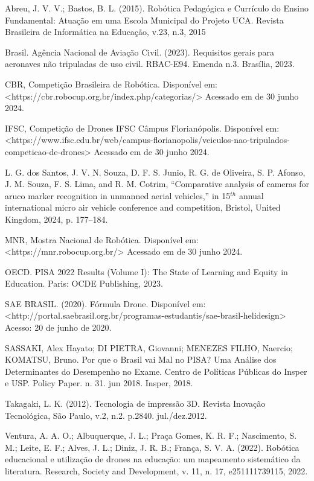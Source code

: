 \documentclass[conference]{IEEEtran}
\begin{document}
\begin{thebibliography}{00}
 Abreu, J. V. V.; Bastos, B. L. (2015). Robótica Pedagógica e Currículo do Ensino Fundamental: Atuação em uma Escola Municipal do Projeto UCA. Revista Brasileira de Informática na Educação, v.23, n.3, 2015

 Brasil. Agência Nacional de Aviação Civil. (2023). Requisitos gerais para aeronaves não tripuladas de uso civil. RBAC-E94. Emenda n.3. Brasília, 2023.

 CBR, Competição Brasileira de Robótica. Disponível em: <https://cbr.robocup.org.br/index.php/categorias/> Acessado em de 30 junho 2024.

 IFSC, Competição de Drones IFSC Câmpus Florianópolis. Disponível em: <https://www.ifsc.edu.br/web/campus-florianopolis/veiculos-nao-tripulados-competicao-de-drones> Acessado em de 30 junho 2024.

 L. G. dos Santos, J. V. N. Souza, D. F. S. Junio, R. G. de Oliveira, S. P. Afonso, J. M. Souza, F. S. Lima, and R. M. Cotrim, “Comparative analysis of cameras for aruco marker recognition in unmanned aerial vehicles,” in 15$^{th}$ annual international micro air vehicle conference and competition, Bristol, United Kingdom, 2024, p. 177–184.

 MNR, Mostra Nacional de Robótica. Disponível em: <https://mnr.robocup.org.br/> Acessado em de 30 junho 2024.

 OECD. PISA 2022 Results (Volume I): The State of Learning and Equity in Education. Paris: OCDE Publishing, 2023.

 SAE BRASIL. (2020). Fórmula Drone. Disponível em: <http://portal.saebrasil.org.br/programas-estudantis/sae-brasil-helidesign> Acesso: 20 de junho de 2020.

 SASSAKI, Alex Hayato; DI PIETRA, Giovanni; MENEZES FILHO, Naercio; KOMATSU, Bruno. Por que o Brasil vai Mal no PISA? Uma Análise dos Determinantes do Desempenho no Exame. Centro de Políticas Públicas do Insper e USP. Policy Paper. n. 31. jun 2018. Insper, 2018. 

 Takagaki, L. K. (2012). Tecnologia de impressão 3D. Revista Inovação Tecnológica, São Paulo, v.2, n.2. p.2840. jul./dez.2012. 

 Ventura, A. A. O.; Albuquerque, J. L.; Praça Gomes, K. R. F.; Nascimento, S. M.; Leite, E. F.; Alves, J. L.; Diniz, J. R. B.; França, S. V. A. (2022). Robótica educacional e utilização de drones na educação: um mapeamento sistemático da literatura. Research, Society and Development, v. 11, n. 17, e251111739115, 2022.


\end{thebibliography}
\end{document}

